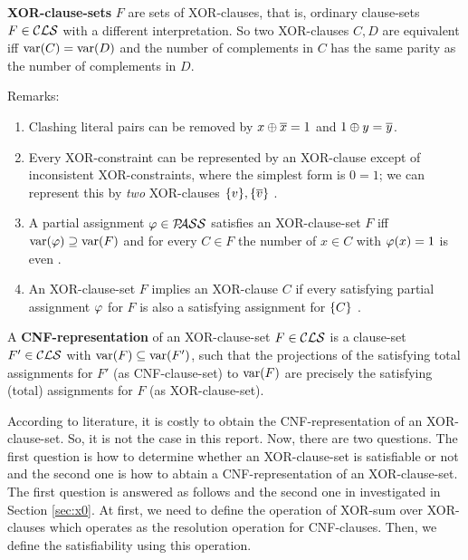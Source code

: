 \documentclass[12pt]{book}
\begin{document}
\begin{defi}\label{def:xor-cls}
      \textbf{XOR-clause-sets} $F$ are sets of XOR-clauses, that is, ordinary clause-sets $F \in \mathcal{CLS}$ with a different interpretation. 
	  So two XOR-clauses $C, D$ are equivalent iff $\operatorname{var}(C) = \operatorname{var}(D)$ and the number of complements in $C$ has the same parity as the 
	  number of complements in $D$.
\end{defi}
Remarks:
\begin{enumerate}
      \item Clashing literal pairs can be removed by $x \oplus \overline{x} = 1$ and $1 \oplus y = \overline{y}$.
	  \item Every XOR-constraint can be represented by an XOR-clause except of inconsistent XOR-constraints, 
	  where the simplest form is $0=1$; we can represent this by \emph{two} XOR-clauses $\{ v \}, \{ \overline{v} \}$ \cite{h8}.
	  \item A partial assignment $\varphi \in \mathcal{P\hspace{-0.32em}ASS}$ satisfies an XOR-clause-set $F$ iff $\operatorname{var}(\varphi) \supseteq \operatorname{var}(F)$ and for 
	  every $C \in F$ the number of $x \in C$ with $\varphi(x) = 1$ is even \cite{h8}. 
	  \item An XOR-clause-set $F$ implies an XOR-clause $C$ if every satisfying partial assignment $\varphi$ for $F$ is also a 
	  satisfying assignment for $\{ C \}$ \cite{h8}.  
\end{enumerate}

\begin{defi}\label{def:cnfrepxor} 
  \cite{h8} A \textbf{CNF-representation} of an XOR-clause-set $F \in \mathcal{CLS}$ is a clause-set $F' \in \mathcal{CLS}$ with $\operatorname{var}(F) \subseteq \operatorname{var}(F')$, 
  such that the projections of the satisfying total assignments for $F'$ (as CNF-clause-set) to $\operatorname{var}(F)$ are precisely the satisfying 
  (total) assignments for $F$ (as XOR-clause-set).
\end{defi}
According to literature, it is costly to obtain the CNF-representation of an XOR-clause-set. So, it is not the case in this report. 
Now, there are two questions. The first question is how to determine whether an XOR-clause-set is satisfiable or not and the
second one is how to abtain a CNF-representation of an XOR-clause-set. The first question is answered as follows and the second 
one in investigated in Section \ref{sec:x0}.
At first, we need to define the operation of XOR-sum over XOR-clauses which operates as the resolution operation for CNF-clauses.
Then, we define the satisfiability using this operation.
\end{document}
